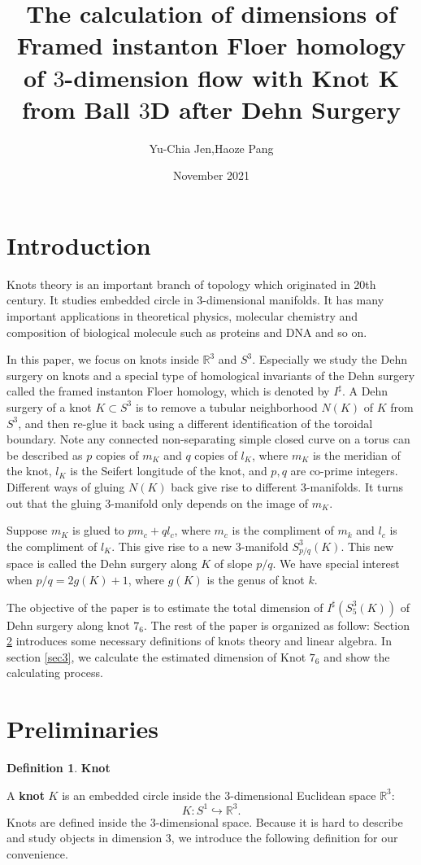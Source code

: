 \documentclass{amsart}
\title{The calculation of dimensions of Framed instanton Floer homology of $3$-dimension flow with Knot K from Ball $3$D after Dehn Surgery}
\author{Yu-Chia Jen,Haoze Pang}
\date{November 2021}
\theoremstyle{definition}
\newtheorem{defn}[thm]{Definition}
\begin{document}
\begin{abstract}
\end{abstract}
\maketitle
\tableofcontents


\section{Introduction}
Knots theory is an important branch of topology which originated in 20th century. It studies embedded circle in $3$-dimensional manifolds. It has many important applications in theoretical physics, molecular chemistry and composition of biological molecule such as proteins and DNA and so on.

In this paper, we focus on knots inside $\mathbb{R}^3$ and $S^3$. Especially we study the Dehn surgery on knots and a special type of homological invariants of the Dehn surgery called the framed instanton Floer homology, which is denoted by $I^{\sharp}$. A Dehn surgery of a knot $K\subset S^3$ is to remove a tubular neighborhood $N(K)$ of $K$ from $S^3$, and then re-glue it back using a different identification of the toroidal boundary. Note any connected non-separating simple closed curve on a torus can be described as $p$ copies of $m_K$ and $q$ copies of $l_K$, where $m_K$ is the meridian of the knot, $l_K$ is the Seifert longitude of the knot, and $p, q$ are co-prime integers. Different ways of gluing $N(K)$ back give rise to different $3$-manifolds. It turns out that the gluing $3$-manifold only depends on the image of $m_K$.

Suppose $m_K$ is glued to $pm_c+ql_c$, where $m_c$ is the compliment of $m_k$ and $l_c$ is the compliment of $l_K$. This give rise to a new 3-manifold $S^3_{p/q}(K)$. This new space is called the Dehn surgery along $K$ of slope $p/q$. We have special interest when $p/q=2g(K)+1$, where $g(K)$ is the genus of knot $k$.

The objective of the paper is to estimate the total dimension of  $I^{\sharp}(S^{3}_{5}(K))$ of Dehn surgery along knot $7_6$. The rest of the paper is organized as follow: Section \ref{sec2} introduces some necessary definitions of knots theory and linear algebra. In section \ref{sec3}, we calculate the estimated dimension of Knot $7_6$ and show the calculating process.   

\section{Preliminaries}\label{sec2}
\begin{defn}
{\bf Knot}
\end{defn}
A {\bf knot} $K$ is an embedded circle inside the $3$-dimensional Euclidean space $\mathbb{R}^3$:
\[K:S^1\hookrightarrow\mathbb{R}^3.\]
Knots are defined inside the $3$-dimensional space. Because it is hard  to describe and study objects in dimension $3$, we introduce the following definition for our convenience.
\end{document}
